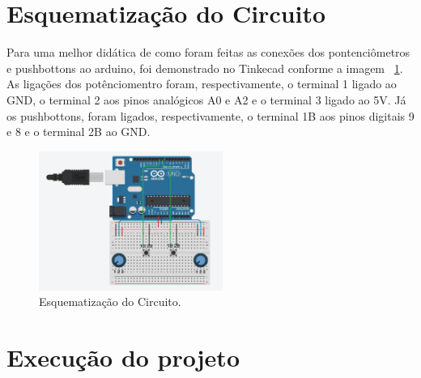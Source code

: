 \documentclass[conference]{IEEEtran}
\begin{document}
\section{Esquematização do Circuito}
Para uma melhor didática de como foram feitas as conexões dos pontenciômetros e pushbottons ao arduino, foi demonstrado no Tinkecad \cite{Tinkercad} conforme a imagem ~\ref{fig:esquema}. As ligações dos potênciomentro foram, respectivamente, o terminal 1 ligado ao GND, o terminal 2 aos pinos analógicos A0 e A2 e o terminal 3 ligado ao 5V. Já os pushbottons, foram ligados, respectivamente, o terminal 1B aos pinos digitais 9 e 8 e o terminal 2B ao GND. 
\begin{figure}[htbp]
\centerline{
    \includegraphics[width= 6cm]{images/Tinkercad.jpeg}
    }
\caption{Esquematização do Circuito.}
\label{fig:esquema}
\end{figure}
\section{Execução do projeto}
\end{document}
